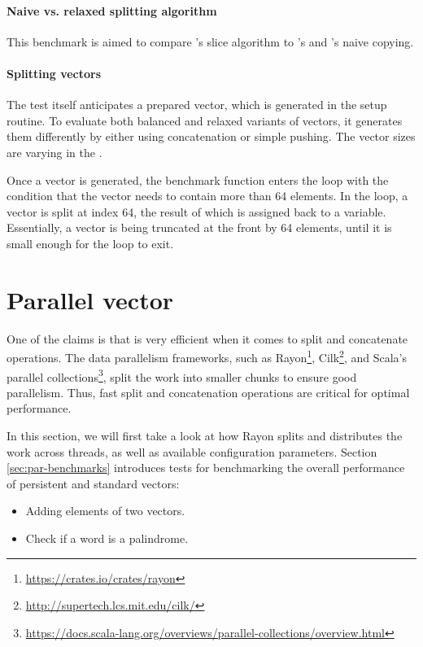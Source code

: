 \paragraph{Naive vs. relaxed splitting algorithm}
This benchmark is aimed to compare \rrbvec{}'s slice algorithm to \stdvec{}'s and \rbvec{}'s naive copying.

\paragraph{Splitting vectors}
The test itself anticipates a prepared vector, which is generated in the setup routine. To evaluate both balanced and relaxed variants of vectors, it generates them differently by either using concatenation or simple pushing. The vector sizes are varying in the \range{[128, \kilo{40}]}.

Once a vector is generated, the benchmark function enters the loop with the condition that the vector needs to contain more than 64 elements. In the loop, a vector is split at index 64, the result of which is assigned back to a variable. Essentially, a vector is being truncated at the front by 64 elements, until it is small enough for the loop to exit.

\section{Parallel vector}
One of the claims is that \rrbvec{} is very efficient when it comes to split and concatenate operations. The data parallelism frameworks, such as Rayon\footnote{\url{https://crates.io/crates/rayon}}, Cilk\footnote{\url{http://supertech.lcs.mit.edu/cilk/}}, and Scala's parallel collections\footnote{\url{https://docs.scala-lang.org/overviews/parallel-collections/overview.html}}, split the work into smaller chunks to ensure good parallelism. Thus, fast split and concatenation operations are critical for optimal performance.

In this section, we will first take a look at how Rayon splits and distributes the work across threads, as well as available configuration parameters. Section \ref{sec:par-benchmarks} introduces tests for benchmarking the overall performance of persistent and standard vectors:

\begin{itemize}
    \item Adding elements of two vectors.
    \item Check if a word is a palindrome.
\end{itemize}

